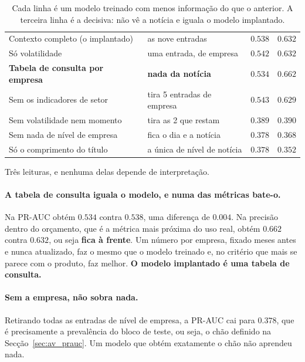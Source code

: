 \begin{table}[ht]
\caption[O modelo, desmontado entrada a entrada]{Cada linha é um modelo treinado com menos
informação do que o anterior. A terceira linha é a decisiva: não vê a notícia e iguala o modelo
implantado.}
\label{tab:av_ablacao}
\centering
\small
\begin{tabular}{L{0.34\textwidth} L{0.30\textwidth} C{0.11\textwidth} C{0.13\textwidth}}
\toprule
{} &  &  &  \\
\midrule
Contexto completo (o implantado) & as nove entradas & $0.538$ & $0.632$ \\
Só volatilidade & uma entrada, de empresa & $0.542$ & $0.632$ \\
\midrule
\textbf{Tabela de consulta por empresa} & \textbf{nada da notícia} & $\mathbf{0.534}$ &
$\mathbf{0.662}$ \\
\midrule
Sem os indicadores de setor & tira 5 entradas de empresa & $0.543$ & $0.629$ \\
Sem volatilidade nem momento & tira as 2 que restam & $0.389$ & $0.390$ \\
Sem nada de nível de empresa & fica o dia e a notícia & $0.378$ & $0.368$ \\
Só o comprimento do título & a única de nível de notícia & $0.378$ & $0.352$ \\
\bottomrule
\end{tabular}
\end{table}

Três leituras, e nenhuma delas depende de interpretação.

\paragraph{A tabela de consulta iguala o modelo, e numa das métricas bate-o.}
Na PR-AUC obtém $0.534$ contra $0.538$, uma diferença de $0.004$. Na precisão dentro do orçamento,
que é a métrica mais próxima do uso real, obtém $0.662$ contra $0.632$, ou seja \textbf{fica à
frente}. Um número por empresa, fixado meses antes e nunca atualizado, faz o mesmo que o modelo
treinado e, no critério que mais se parece com o produto, faz melhor.
\textbf{O modelo implantado é uma tabela de consulta.}

\paragraph{Sem a empresa, não sobra nada.}
Retirando todas as entradas de nível de empresa, a PR-AUC cai para $0.378$, que é precisamente a
prevalência do bloco de teste, ou seja, o chão definido na Secção~\ref{sec:av_prauc}. Um modelo que
obtém exatamente o chão não aprendeu nada.

